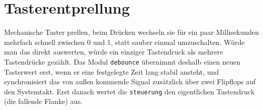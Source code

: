 \section{Tasterentprellung}

Mechanische Taster \glqq prellen\grqq{}, beim Drücken wechseln sie für ein paar Millisekunden mehrfach schnell zwischen 0 und 1, statt sauber einmal umzuschalten. Würde man das direkt auswerten, würde ein einziger Tastendruck als mehrere Tastendrücke gezählt. Das Modul \texttt{debounce} übernimmt deshalb einen neuen Tasterwert erst, wenn er eine festgelegte Zeit lang stabil ansteht, und synchronisiert das von außen kommende Signal zusätzlich über zwei Flipflops auf den Systemtakt. Erst danach wertet die \texttt{steuerung} den eigentlichen Tastendruck (die fallende Flanke) aus.
